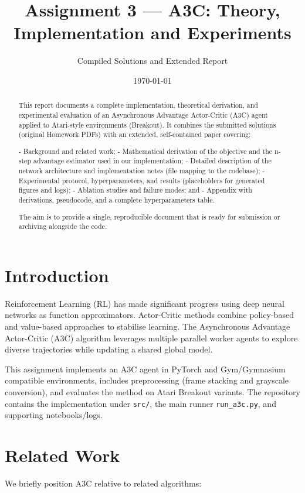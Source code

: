 \documentclass[11pt]{article}
\title{Assignment 3 — A3C: Theory, Implementation and Experiments}
\author{Compiled Solutions and Extended Report}
\date{\today}
\begin{document}
\maketitle

\begin{abstract}
This report documents a complete implementation, theoretical derivation, and experimental evaluation of an Asynchronous Advantage Actor-Critic (A3C) agent applied to Atari-style environments (Breakout). It combines the submitted solutions (original Homework PDFs) with an extended, self-contained paper covering:

- Background and related work;
- Mathematical derivation of the objective and the n-step advantage estimator used in our implementation;
- Detailed description of the network architecture and implementation notes (file mapping to the codebase);
- Experimental protocol, hyperparameters, and results (placeholders for generated figures and logs);
- Ablation studies and failure modes; and
- Appendix with derivations, pseudocode, and a complete hyperparameters table.

The aim is to provide a single, reproducible document that is ready for submission or archiving alongside the code.
\end{abstract}

\tableofcontents
\clearpage

\section{Introduction}
Reinforcement Learning (RL) has made significant progress using deep neural networks as function approximators. Actor-Critic methods combine policy-based and value-based approaches to stabilise learning. The Asynchronous Advantage Actor-Critic (A3C) algorithm \cite{mnih2016asynchronous} leverages multiple parallel worker agents to explore diverse trajectories while updating a shared global model.

This assignment implements an A3C agent in PyTorch and Gym/Gymnasium compatible environments, includes preprocessing (frame stacking and grayscale conversion), and evaluates the method on Atari Breakout variants. The repository contains the implementation under \texttt{src/}, the main runner \texttt{run\_a3c.py}, and supporting notebooks/logs.

\section{Related Work}
We briefly position A3C relative to related algorithms:
\end{document}

